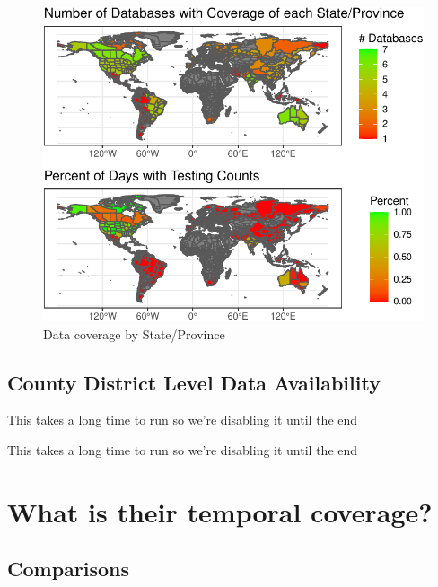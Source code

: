 \documentclass[
]{book}
\begin{document}
\begin{figure}

{\centering \includegraphics[width=1\linewidth]{HowToBeCarefulWithCovid19Counts_files/figure-latex/nice-fig3-1} 

}

\caption{Data coverage by State/Province}\label{fig:nice-fig3}
\end{figure}

\hypertarget{county-district-level-data-availability}{%
\subsection{County District Level Data Availability}\label{county-district-level-data-availability}}

This takes a long time to run so we're disabling it until the end

This takes a long time to run so we're disabling it until the end

\hypertarget{what-is-their-temporal-coverage}{%
\section{What is their temporal coverage?}\label{what-is-their-temporal-coverage}}

\hypertarget{comparisons}{%
\subsection{Comparisons}\label{comparisons}}
\end{document}
